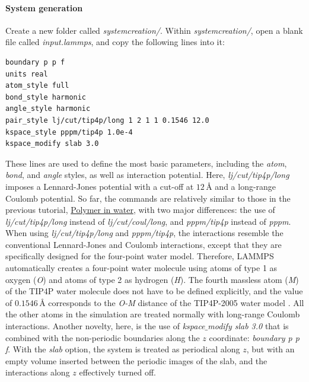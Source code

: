 \documentclass[9pt,tutorial]{livecoms}
\begin{document}
\paragraph{System generation}
Create a new folder called \textit{systemcreation/}. Within \textit{systemcreation/}, open a blank file called \textit{input.lammps}, and copy the following lines into it:
{\normalsize \begin{verbatim}
boundary p p f
units real
atom_style full
bond_style harmonic
angle_style harmonic
pair_style lj/cut/tip4p/long 1 2 1 1 0.1546 12.0
kspace_style pppm/tip4p 1.0e-4
kspace_modify slab 3.0
\end{verbatim}}
These lines are used to define the most basic parameters, including the \textit{atom}, \textit{bond}, and \textit{angle} styles, as well as interaction potential. Here, \textit{lj/cut/tip4p/long} imposes a Lennard-Jones potential with a cut-off at $12\,\text{$\text{\AA{}}$}$ and a long-range Coulomb potential. So far, the commands are relatively similar to those in the previous tutorial, \hyperref[all-atoms-label]{Polymer in water}, with two major differences: the use of \textit{lj/cut/tip4p/long} instead of \textit{lj/cut/coul/long}, and \textit{pppm/tip4p} instead of \textit{pppm}. When using \textit{lj/cut/tip4p/long} and \textit{pppm/tip4p}, the interactions resemble the conventional Lennard-Jones and Coulomb interactions, except that they are specifically designed for the four-point water model. Therefore, LAMMPS automatically creates a four-point water molecule using atoms of type 1 as oxygen (\textit{O}) and atoms of type 2 as hydrogen (\textit{H}). The fourth massless atom (\textit{M}) of the TIP4P water molecule does not have to be defined explicitly, and the value of $0.1546\,\text{$\text{\AA{}}$}$ corresponds to the \textit{O-M} distance of the TIP4P-2005 water model \cite{abascal2005general}. All the other atoms in the simulation are treated normally with long-range Coulomb interactions. Another novelty, here, is the use of \textit{kspace$\_$modify slab 3.0} that is combined with the non-periodic boundaries along the $z$ coordinate: \textit{boundary p p f}. With the \textit{slab} option, the system is treated as periodical along $z$, but with an empty volume inserted between the periodic images of the slab, and the interactions along $z$ effectively turned off.
\end{document}
